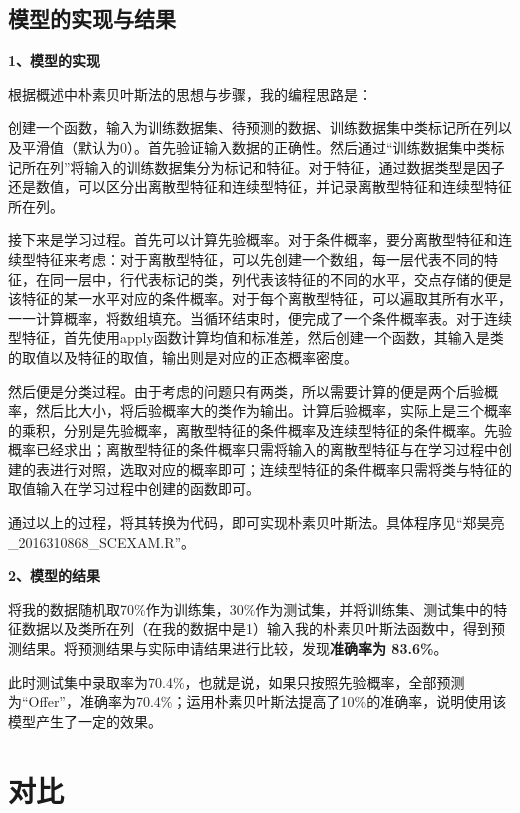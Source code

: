 \documentclass[UTF8,cs4size]{ctexart}
\begin{document}
\subsection{\heiti 模型的实现与结果}
\noindent \textbf{1、模型的实现}
\par 根据概述中朴素贝叶斯法的思想与步骤，我的编程思路是：
{ 
\par 创建一个函数，输入为训练数据集、待预测的数据、训练数据集中类标记所在列以及平滑值（默认为0）。首先验证输入数据的正确性。然后通过“训练数据集中类标记所在列”将输入的训练数据集分为标记和特征。对于特征，通过数据类型是因子还是数值，可以区分出离散型特征和连续型特征，并记录离散型特征和连续型特征所在列。
\par 接下来是学习过程。首先可以计算先验概率。对于条件概率，要分离散型特征和连续型特征来考虑：对于离散型特征，可以先创建一个数组，每一层代表不同的特征，在同一层中，行代表标记的类，列代表该特征的不同的水平，交点存储的便是该特征的某一水平对应的条件概率。对于每个离散型特征，可以遍取其所有水平，一一计算概率，将数组填充。当循环结束时，便完成了一个条件概率表。对于连续型特征，首先使用apply函数计算均值和标准差，然后创建一个函数，其输入是类的取值以及特征的取值，输出则是对应的正态概率密度。
\par 然后便是分类过程。由于考虑的问题只有两类，所以需要计算的便是两个后验概率，然后比大小，将后验概率大的类作为输出。计算后验概率，实际上是三个概率的乘积，分别是先验概率，离散型特征的条件概率及连续型特征的条件概率。先验概率已经求出；离散型特征的条件概率只需将输入的离散型特征与在学习过程中创建的表进行对照，选取对应的概率即可；连续型特征的条件概率只需将类与特征的取值输入在学习过程中创建的函数即可。}
\par 通过以上的过程，将其转换为代码，即可实现朴素贝叶斯法。具体程序见“郑昊亮\_2016310868\_SCEXAM.R”。

\vspace{3ex}
\noindent \textbf{2、模型的结果}
\par 将我的数据随机取70\%作为训练集，30\%作为测试集，并将训练集、测试集中的特征数据以及类所在列（在我的数据中是1）输入我的朴素贝叶斯法函数中，得到预测结果。将预测结果与实际申请结果进行比较，发现\textbf{准确率为 83.6\%}。
\par 此时测试集中录取率为70.4\%，也就是说，如果只按照先验概率，全部预测为“Offer”，准确率为70.4\%；运用朴素贝叶斯法提高了10\%的准确率，说明使用该模型产生了一定的效果。

\section{\heiti 对比}
\end{document}
